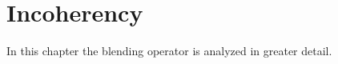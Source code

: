 \chapter{Incoherency} \label{chap:Incoherency}

In this chapter the blending operator is analyzed in greater detail.

